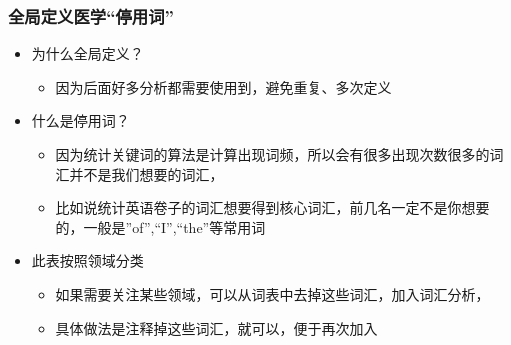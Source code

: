 \documentclass[11pt]{article}
\providecommand{\tightlist}{%
      \setlength{\itemsep}{0pt}\setlength{\parskip}{0pt}}
\begin{document}
    \subsubsection{全局定义医学``停用词''}\label{ux5168ux5c40ux5b9aux4e49ux533bux5b66ux505cux7528ux8bcd}

\begin{itemize}
\tightlist
\item
  为什么全局定义？

  \begin{itemize}
  \tightlist
  \item
    因为后面好多分析都需要使用到，避免重复、多次定义
  \end{itemize}
\item
  什么是停用词？

  \begin{itemize}
  \tightlist
  \item
    因为统计关键词的算法是计算出现词频，所以会有很多出现次数很多的词汇并不是我们想要的词汇，
  \item
    比如说统计英语卷子的词汇想要得到核心词汇，前几名一定不是你想要的，一般是''of'',``I'',``the''等常用词
  \end{itemize}
\item
  此表按照领域分类

  \begin{itemize}
  \tightlist
  \item
    如果需要关注某些领域，可以从词表中去掉这些词汇，加入词汇分析，
  \item
    具体做法是注释掉这些词汇，就可以，便于再次加入
  \end{itemize}
\end{itemize}
\end{document}
